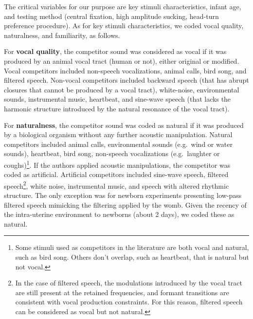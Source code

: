 \documentclass[
  man,mask,floatsintext]{apa6}
\begin{document}
The critical variables for our purpose are key stimuli characteristics, infant age, and testing method (central fixation, high amplitude sucking, head-turn preference procedure). As for key stimuli characteristics, we coded vocal quality, naturalness, and familiarity, as follows.

For \textbf{vocal quality}, the competitor sound was considered as vocal if it was produced by an animal vocal tract (human or not), either original or modified. Vocal competitors included non-speech vocalizations, animal calls, bird song, and filtered speech. Non-vocal competitors included backward speech (that has abrupt closures that cannot be produced by a vocal tract), white-noise, environmental sounds, instrumental music, heartbeat, and sine-wave speech (that lacks the harmonic structure introduced by the natural resonance of the vocal tract).

For \textbf{naturalness}, the competitor sound was coded as natural if it was produced by a biological organism without any further acoustic manipulation. Natural competitors included animal calls, environmental sounds (e.g.~wind or water sounds), heartbeat, bird song, non-speech vocalizations (e.g.~laughter or coughs)\footnote{Some stimuli used as competitors in the literature are both vocal and natural, such as bird song. Others don't overlap, such as heartbeat, that is natural but not vocal.}. If the authors applied acoustic manipulations, the competitor was coded as artificial. Artificial competitors included sine-wave speech, filtered speech\footnote{In the case of filtered speech, the modulations introduced by the vocal tract are still present at the retained frequencies, and formant transitions are consistent with vocal production constraints. For this reason, filtered speech can be considered as vocal but not natural.}, white noise, instrumental music, and speech with altered rhythmic structure. The only exception was for newborn experiments presenting low-pass filtered speech mimicking the filtering applied by the womb. Given the recency of the intra-uterine environment to newborns (about 2 days), we coded these as natural.
\end{document}
